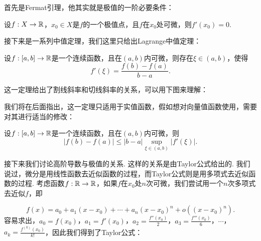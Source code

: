 首先是Fermat引理，他其实就是极值的一阶必要条件：

\begin{lemma}[Fermat引理]\label{lemma:fermat}
    设$f:X\to\mathbb{R}$，$x_0\in X$是$f$的一个极值点，且$f$在$x_0$处可微，则$f'(x_0)=0$.
\end{lemma}

接下来是一系列中值定理，我们这里只给出Lagrange中值定理：

\begin{theorem}[Lagrange中值定理]\label{thm:lagrange-mid}
    设$f:[a,b]\to\mathbb{R}$是一个连续函数，且在$(a,b)$内可微，则存在$\xi\in(a,b)$，使得
    \[
        f'(\xi)=\frac{f(b)-f(a)}{b-a}.
    \]
\end{theorem}

这一定理给出了割线斜率和切线斜率的关系，可以用下图来理解：

\begin{center}
\end{center}
我们将在后面指出，这一定理只适用于实值函数，假如想对向量值函数使用，需要对其进行适当的修改：

\begin{theorem}[Lagrange有限增量定理]\label{thm:lagrange-finite}
    设$f:[a,b]\to\mathbb{R}$是一个连续函数，且在$(a,b)$内可微，则
    \[
        |f(b)-f(a)|\leq |b-a|\sup_{\xi\in(a,b)}|f'(\xi)|.
    \]
\end{theorem}

接下来我们讨论高阶导数与极值的关系. 这样的关系是由Taylor公式给出的. 我们说过，微分是用线性函数去近似函数的过程，而Taylor公式则是用多项式去近似函数的过程. 考虑函数$f:\mathbb{R}\to\mathbb{R}$，如果$f$在$x_0$处$n$次可微，我们尝试用一个$n$次多项式去近似$f$，即

\[
    f(x)=a_0+a_1(x-x_0)+\cdots+a_n(x-x_0)^n+o((x-x_0)^n).
\]
容易求出，$a_0=f(x_0)$，$a_1=f'(x_0)$，$a_2=\frac{f''(x_0)}{2}$，$a_3=\frac{f'''(x_0)}{6}$，$\cdots$，$a_k=\frac{f^{(k)}(x_0)}{k!}$，因此我们得到了Taylor公式：

